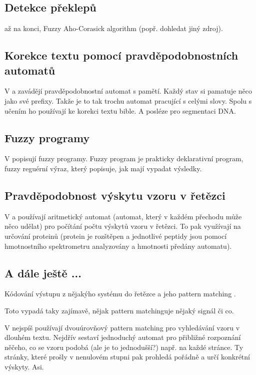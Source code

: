 \documentclass[a4paper,10pt]{article}
\begin{document}
\subsection{Detekce překlepů}
\cite{AndAbdAsm-ApprPattMatcFuzzLog} až na konci,  Fuzzy Aho-Corasick algorithm (popř. dohledat jiný zdroj).

\cite{SnaKepAbrHas-AproxStriMatchFuzzAut}

\subsection{Korekce textu pomocí pravděpodobnostních automatů}
V \cite{YorSinTis-PowAmnLeaPrAuVarMemLen} a \cite{Ron-AutLeaApp} zavádějí pravděpodobnostní automat s pamětí. Každý stav si pamatuje něco jako své prefixy. Takže je to tak trochu automat pracující s celými slovy. Spolu s učením ho používají ke korekci textu bible. A posléze pro segmentaci DNA.


\subsection{Fuzzy programy}
V \cite{Cha-ExeFuzProUsFiStaMa} popisují fuzzy programy. Fuzzy program je prakticky deklarativní program, fuzzy reguérní výraz, který popisuje, jak mají vypadat výsledky.

\subsection{Pravděpodobnost výskytu vzoru v řetězci}
V \cite{Mar+-ProAriAutApp} a \cite{Her-ProAriAutAppSoComFraBioSeqAna} používají aritmetický automat (automat, který v každém přechodu může něco udělat) pro počítání počtu výskytů vzoru v řetězci. To pak využívají na určování proteinů (protein je rozštěpen a jednotlivé peptidy jsou pomocí hmotnostního spektrometru analyzovány a hmotnosti předány automatu). 

\subsection{A dále ještě ...}
Kódování výstupu z nějakýho systému do řetězce a jeho pattern matching \cite{Rig-FauDetIsoBasFuzzAut}. 

Toto \cite{BaiTri-PattRecUsiTemFuzzAut} vypadá taky zajímavě, nějak pattern matchinguje nějaký signál či co.

V \cite{Hun-NoLiTexSeaUsFuFiStLiNoDetAut} nejspíš používají dvouúrovňový pattern matching pro vyhledávání vzoru v dlouhém textu. Nejdřív sestaví jednoduchý automat pro přibližné rozpoznání něčeho, co se vzoru podobá (ale je to jednodušší?) např. na každé stránce. Ty stránky, které prošly v nenulovém stupni pak prohledá pořádně a určí konkrétní výskyty. Asi. 
\end{document}

